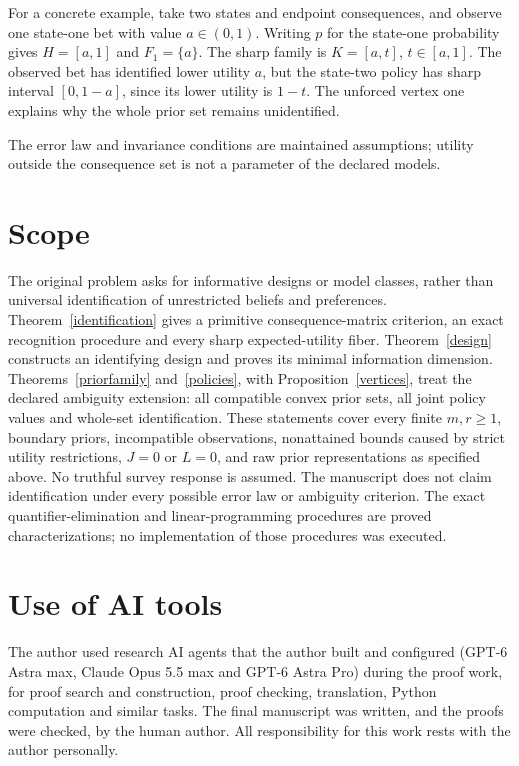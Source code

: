 \documentclass[11pt]{article}
\begin{document}
For a concrete example, take two states and endpoint consequences, and observe one state-one bet with value $a\in(0,1)$. Writing $p$ for the state-one probability gives $H=[a,1]$ and $F_1=\{a\}$. The sharp family is $K=[a,t]$, $t\in[a,1]$. The observed bet has identified lower utility $a$, but the state-two policy has sharp interval $[0,1-a]$, since its lower utility is $1-t$. The unforced vertex one explains why the whole prior set remains unidentified.

The error law and invariance conditions are maintained assumptions; utility outside the consequence set is not a parameter of the declared models.

\section{Scope}
The original problem asks for informative designs or model classes, rather than universal identification of unrestricted beliefs and preferences. Theorem~\ref{identification} gives a primitive consequence-matrix criterion, an exact recognition procedure and every sharp expected-utility fiber. Theorem~\ref{design} constructs an identifying design and proves its minimal information dimension. Theorems~\ref{priorfamily} and~\ref{policies}, with Proposition~\ref{vertices}, treat the declared ambiguity extension: all compatible convex prior sets, all joint policy values and whole-set identification. These statements cover every finite $m,r\ge1$, boundary priors, incompatible observations, nonattained bounds caused by strict utility restrictions, $J=0$ or $L=0$, and raw prior representations as specified above. No truthful survey response is assumed. The manuscript does not claim identification under every possible error law or ambiguity criterion. The exact quantifier-elimination and linear-programming procedures are proved characterizations; no implementation of those procedures was executed.

\section*{Use of AI tools}
The author used research AI agents that the author built and configured (GPT-6 Astra max,
Claude Opus 5.5 max and GPT-6 Astra Pro) during the proof work, for proof search and
construction, proof checking, translation, Python computation and similar tasks. The final
manuscript was written, and the proofs were checked, by the human author. All responsibility
for this work rests with the author personally.
\end{document}
